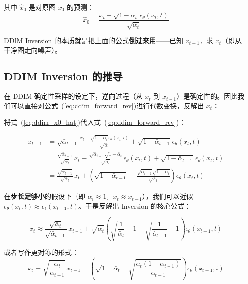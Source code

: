 \documentclass[11pt,a4paper]{article}
\theoremstyle{definition}
\newcommand{\alphat}{\bar{\alpha}_t}
\begin{document}
其中 $\hat{x}_0$ 是对原图 $x_0$ 的预测：
\begin{equation}\label{eq:ddim_x0_hat}
    \hat{x}_0 = \frac{x_t - \sqrt{1 - \alphat}\, \epsilon_\theta(x_t, t)}{\sqrt{\alphat}}
\end{equation}

DDIM Inversion 的本质就是把上面的公式\textbf{倒过来用}——已知 $x_{t-1}$，求 $x_t$（即从干净图走向噪声）。

\subsection{DDIM Inversion 的推导}

在 DDIM 确定性采样的设定下，逆向过程（从 $x_t$ 到 $x_{t-1}$）是确定性的。因此我们可以直接对公式~(\ref{eq:ddim_forward_rev})进行代数变换，反解出 $x_t$：

将式~(\ref{eq:ddim_x0_hat})代入式~(\ref{eq:ddim_forward_rev})：

\begin{align}
    x_{t-1} &= \sqrt{\bar{\alpha}_{t-1}}\, \frac{x_t - \sqrt{1 - \alphat}\, \epsilon_\theta(x_t, t)}{\sqrt{\alphat}}
              + \sqrt{1 - \bar{\alpha}_{t-1}}\, \epsilon_\theta(x_t, t) \\[4pt]
            &= \frac{\sqrt{\bar{\alpha}_{t-1}}}{\sqrt{\alphat}}\, x_t
               - \frac{\sqrt{\bar{\alpha}_{t-1}}\sqrt{1 - \alphat}}{\sqrt{\alphat}}\, \epsilon_\theta(x_t, t)
               + \sqrt{1 - \bar{\alpha}_{t-1}}\, \epsilon_\theta(x_t, t) \\[4pt]
            &= \frac{\sqrt{\bar{\alpha}_{t-1}}}{\sqrt{\alphat}}\, x_t
               + \left(\sqrt{1 - \bar{\alpha}_{t-1}} - \frac{\sqrt{\bar{\alpha}_{t-1}}\sqrt{1 - \alphat}}{\sqrt{\alphat}}\right) \epsilon_\theta(x_t, t)
\end{align}

在\textbf{步长足够小}的假设下（即 $\alpha_t \approx 1$，$x_t \approx x_{t-1}$），我们可以近似 $\epsilon_\theta(x_t, t) \approx \epsilon_\theta(x_{t-1}, t)$。于是反解出 Inversion 的核心公式：

\begin{equation}\label{eq:ddim_inversion}
    x_t \approx \frac{\sqrt{\alphat}}{\sqrt{\bar{\alpha}_{t-1}}}\, x_{t-1}
            + \sqrt{\alphat}\left(\sqrt{\frac{1}{\alphat} - 1} - \sqrt{\frac{1}{\bar{\alpha}_{t-1}} - 1}\right) \epsilon_\theta(x_{t-1}, t)
\end{equation}

或者写作更对称的形式：
\begin{equation}\label{eq:ddim_inversion_v2}
    x_t = \sqrt{\frac{\alphat}{\bar{\alpha}_{t-1}}}\, x_{t-1}
        + \left(\sqrt{1 - \alphat} - \sqrt{\frac{\alphat(1 - \bar{\alpha}_{t-1})}{\bar{\alpha}_{t-1}}}\right) \epsilon_\theta(x_{t-1}, t)
\end{equation}
\end{document}
